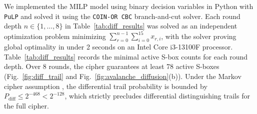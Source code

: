 \documentclass[review,12pt]{elsarticle}
\begin{document}
We implemented the MILP model using binary decision variables in Python with \texttt{PuLP} and solved it using the \texttt{COIN-OR CBC} branch-and-cut solver. Each round depth $n \in \{1, \dots, 8\}$ in Table~\ref{tab:diff_results} was solved as an independent optimization problem minimizing $\sum_{r=0}^{n-1} \sum_{i=0}^{15} x_{r,i}$, with the solver proving global optimality in under 2 seconds on an Intel Core i3-13100F processor. Table~\ref{tab:diff_results} records the minimal active S-box counts for each round depth. Over 8 rounds, the cipher guarantees at least 78 active S-boxes (Fig.~\ref{fig:diff_trail} and Fig.~\ref{fig:avalanche_diffusion}(b)). Under the Markov cipher assumption \cite{lai1991markov}, the differential trail probability is bounded by $P_{\text{diff}} \le 2^{-468} < 2^{-128}$, which strictly precludes differential distinguishing trails for the full cipher.

\begin{table}[htbp]
\caption{Active S-box lower bound scan (differential cryptanalysis)}
\label{tab:diff_results}
\centering
{}
\end{table}
\end{document}
